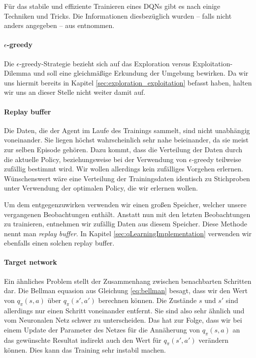 Für das stabile und effiziente Trainieren eines DQNs gibt es nach \cite{11_maxim2018deeprl} einige Techniken und Tricks. Die Informationen diesbezüglich wurden -- falls nicht anders angegeben -- aus \cite{11_maxim2018deeprl} entnommen.

\paragraph{$ \epsilon $-greedy}
Die $ \epsilon $-greedy-Strategie bezieht sich auf das \glqq Exploration versus Exploitation\grqq{}-Dilemma und soll eine gleichmäßige Erkundung der Umgebung bewirken. Da wir uns hiermit bereits in Kapitel \ref{sec:exploration_exploitation} befasst haben, halten wir uns an dieser Stelle nicht weiter damit auf.

\paragraph{Replay buffer}
Die Daten, die der Agent im Laufe des Trainings sammelt, sind nicht unabhängig voneinander. Sie liegen höchst wahrscheinlich sehr nahe beieinander, da sie meist zur selben Episode gehören. Dazu kommt, dass die Verteilung der Daten durch die aktuelle Policy, beziehungsweise bei der Verwendung von $ \epsilon $-greedy teilweise zufällig bestimmt wird. Wir wollen allerdings kein zufälliges Vorgehen erlernen. Wünschenswert wäre eine Verteilung der Trainingsdaten identisch zu Stichproben unter Verwendung der optimalen Policy, die wir erlernen wollen.

Um dem entgegenzuwirken verwenden wir einen großen Speicher, welcher unsere vergangenen Beobachtungen enthält. Anstatt nun mit den letzten Beobachtungen zu trainieren, entnehmen wir zufällig Daten aus diesem Speicher. Diese Methode nennt man \textit{replay buffer}. In Kapitel \ref{sec:qLearningImplementation} verwenden wir ebenfalls einen solchen replay buffer.

\paragraph{Target network}
Ein ähnliches Problem stellt der Zusammenhang zwischen benachbarten Schritten dar. Die Bellman equasion aus Gleichung \ref{eq:bellman} besagt, dass wir den Wert von $ q_\pi(s, a) $ über $ q_\pi(s', a') $ berechnen können. Die Zustände $ s $ und $ s' $ sind allerdings nur einen Schritt voneinander entfernt. Sie sind also sehr ähnlich und vom Neuronalen Netz schwer zu unterscheiden. Das hat zur Folge, dass wir bei einem Update der Parameter des Netzes für die Annäherung von $ q_\pi(s, a) $ an das gewünschte Resultat indirekt auch den Wert für $ q_\pi(s', a') $ verändern können. Dies kann das Training sehr instabil machen.

